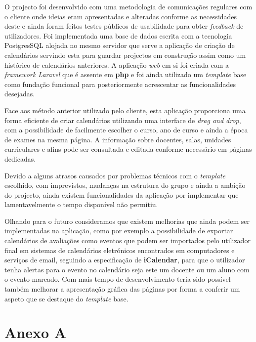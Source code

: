 \documentclass[11pt, twoside]{report}
\begin{document}
	O projecto foi desenvolvido com uma metodologia de comunicações regulares com o cliente onde ideias eram apresentadas e alteradas conforme as necessidades deste e ainda foram feitos testes públicos de usabilidade para obter \textit{feedback} de utilizadores.
	Foi implementada uma base de dados escrita com a tecnologia PostgresSQL alojada no mesmo servidor que serve a aplicação de criação de calendários servindo esta para guardar projectos em construção assim como um histórico de calendários anteriores.
	A aplicação \textit{web} em si foi criada com a \textit{framework Laravel} que é assente em \textbf{php} e foi ainda utilizado um \textit{template} base como fundação funcional para posteriormente acrescentar as funcionalidades desejadas.
	
	Face aos método anterior utilizado pelo cliente, esta aplicação proporciona uma forma eficiente de criar calendários utilizando uma interface de \textit{drag and drop}, com a possibilidade de facilmente escolher o curso, ano de curso e ainda a época de exames na mesma página.
	A informação sobre docentes, salas, unidades curriculares e afins pode ser consultada e editada conforme necessário em páginas dedicadas.
	
	Devido a alguns atrasos causados por problemas técnicos com o \textit{template} escolhido, com imprevistos, mudanças na estrutura do grupo e ainda a ambição do projecto, ainda existem funcionalidades da aplicação por implementar que lamentavelmente o tempo disponível não permitiu.
	
	Olhando para o futuro consideramos que existem melhorias que ainda podem ser implementadas na aplicação, como por exemplo a possibilidade de exportar calendários de avaliações como eventos que podem ser importados pelo utilizador final em sistemas de calendários eletrónicos encontrados em computadores e serviços de email, seguindo a especificação de \textbf{iCalendar}\cite{rfc2445}\cite{1644111}, para que o utilizador tenha alertas para o evento no calendário seja este um docente ou um aluno com o evento marcado.
	Com mais tempo de desenvolvimento teria sido possível também melhorar a apresentação gráfica das páginas por forma a conferir um aspeto que se destaque do \textit{template} base.
	
	
	
	
	\pagestyle{empty}
	
	\chapter*{Anexo A}
\end{document}
